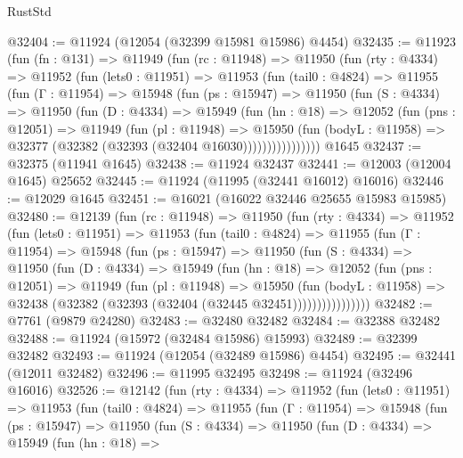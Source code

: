 \begin{lexlean}{RustStd}
\begin{coremodule}
{\begin{coremodule}
{{{{{{{{{{{{{{{{{{{{{{{{{{{{{{{{{{{{{{{{{{{{{{{{{{{{{{{{{{{{{{{{{{{{{{{{{{{{{{{{@32404 := @11924 (@12054 (@32399 @15981 @15986) @4454)
@32435 := @11923
    (fun (fn : @131) =>
    @11949
      (fun (rc : @11948) =>
      @11950
        (fun (rty : @4334) =>
        @11952
          (fun (lets0 : @11951) =>
          @11953
            (fun (tail0 : @4824) =>
            @11955
              (fun (Γ : @11954) =>
              @15948
                (fun (ps : @15947) =>
                @11950
                  (fun (S : @4334) =>
                  @11950
                    (fun (D : @4334) =>
                    @15949
                      (fun (hn : @18) =>
                      @12052
                        (fun (pns : @12051) =>
                        @11949
                          (fun (pl : @11948) =>
                          @15950
                            (fun (bodyL : @11958) =>
                            @32377 (@32382 (@32393 (@32404 @16030))))))))))))))))
    @1645
@32437 := @32375 (@11941 @1645)
@32438 := @11924 @32437
@32441 := @12003 (@12004 @1645) @25652
@32445 := @11924 (@11995 (@32441 @16012) @16016)
@32446 := @12029 @1645
@32451 := @16021 (@16022 @32446 @25655 @15983 @15985)
@32480 := @12139
    (fun (rc : @11948) =>
    @11950
      (fun (rty : @4334) =>
      @11952
        (fun (lets0 : @11951) =>
        @11953
          (fun (tail0 : @4824) =>
          @11955
            (fun (Γ : @11954) =>
            @15948
              (fun (ps : @15947) =>
              @11950
                (fun (S : @4334) =>
                @11950
                  (fun (D : @4334) =>
                  @15949
                    (fun (hn : @18) =>
                    @12052
                      (fun (pns : @12051) =>
                      @11949
                        (fun (pl : @11948) =>
                        @15950
                          (fun (bodyL : @11958) =>
                          @32438 (@32382 (@32393 (@32404 (@32445 @32451))))))))))))))))
@32482 := @7761 (@9879 @24280)
@32483 := @32480 @32482
@32484 := @32388 @32482
@32488 := @11924 (@15972 (@32484 @15986) @15993)
@32489 := @32399 @32482
@32493 := @11924 (@12054 (@32489 @15986) @4454)
@32495 := @32441 (@12011 @32482)
@32496 := @11995 @32495
@32498 := @11924 (@32496 @16016)
@32526 := @12142
    (fun (rty : @4334) =>
    @11952
      (fun (lets0 : @11951) =>
      @11953
        (fun (tail0 : @4824) =>
        @11955
          (fun (Γ : @11954) =>
          @15948
            (fun (ps : @15947) =>
            @11950
              (fun (S : @4334) =>
              @11950
                (fun (D : @4334) =>
                @15949
                  (fun (hn : @18) =>
}}}}}}}}}}}}}}}}}}}}}}}}}}}}}}}}}}}}}}}}}}}}}}}}}}}}}}}}}}}}}}}}}}}}}}}}}}}}}}}}
\end{coremodule}}
\end{coremodule}
\end{lexlean}

